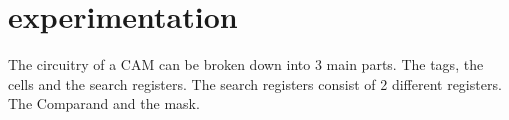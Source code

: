 \section{experimentation}
The circuitry of a CAM can be broken down into 3 main parts. The tags, the cells and the search registers. 
The search registers consist of 2 different registers. The Comparand and the mask. 